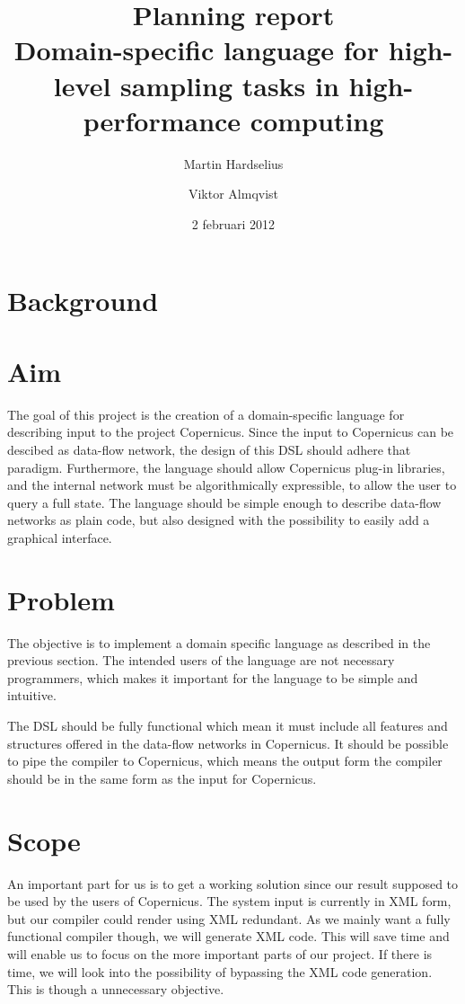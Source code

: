 \documentclass[a4paper]{article}
\title{Planning report\\
  \large{Domain-specific language for high-level
  sampling tasks in high-performance computing
  }
}
\author{Martin Hardselius \and Viktor Almqvist}
\date{2 februari 2012}
\begin{document}
\maketitle
\newpage

\section{Background}

\section{Aim}
The goal of this project is the creation of a domain-specific language
for describing input to the project Copernicus. Since the input to
Copernicus can be descibed as data-flow network, the design of this
DSL should adhere that paradigm. Furthermore, the language should
allow Copernicus plug-in libraries, and the internal network must be
algorithmically expressible, to allow the user to query a full
state. The language should be simple enough to describe data-flow
networks as plain code, but also designed with the possibility to
easily add a graphical interface.

\section{Problem}

The objective is to implement a domain specific language as described
in the previous section. The intended users of the language are not
necessary programmers, which makes it important for the language to be
simple and intuitive.

The DSL should be fully functional which mean it must include all
features and structures offered in the data-flow networks in
Copernicus. It should be possible to pipe the compiler to Copernicus,
which means the output form the compiler should be in the same form as
the input for Copernicus.


\section{Scope}

An important part for us is to get a working solution since our result
supposed to be used by the users of Copernicus. The system input is
currently in XML form, but our compiler could render using XML
redundant. As we mainly want a fully functional compiler though, we
will generate XML code. This will save time and will enable us to
focus on the more important parts of our project. If there is time, we
will look into the possibility of bypassing the XML code
generation. This is though a unnecessary objective.
\end{document}
